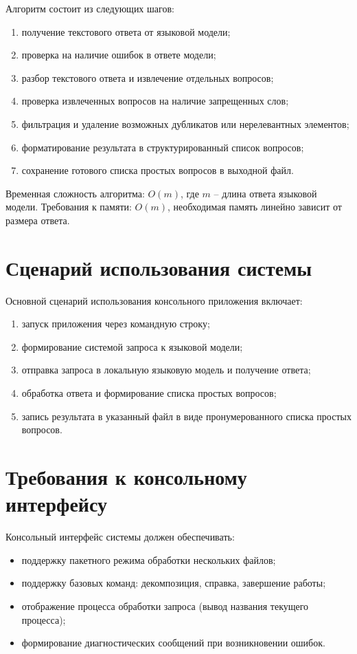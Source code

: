 Алгоритм состоит из следующих шагов:
\begin{enumerate}
	\item получение текстового ответа от языковой модели;
	\item проверка на наличие ошибок в ответе модели;
	\item разбор текстового ответа и извлечение отдельных вопросов;
	\item проверка извлеченных вопросов на наличие запрещенных слов;
	\item фильтрация и удаление возможных дубликатов или нерелевантных элементов;
	\item форматирование результата в структурированный список вопросов;
	\item сохранение готового списка простых вопросов в выходной файл.
\end{enumerate}

Временная сложность алгоритма: $O(m)$, где $m$ -- длина ответа языковой модели.
Требования к памяти: $O(m)$, необходимая память линейно зависит от размера ответа.

\section{Сценарий использования системы}

Основной сценарий использования консольного приложения включает:
\begin{enumerate}
	\item запуск приложения через командную строку;
	\item формирование системой запроса к языковой модели;
	\item отправка запроса в локальную языковую модель и получение ответа;
	\item обработка ответа и формирование списка простых вопросов;
	\item запись результата в указанный файл в виде пронумерованного списка простых вопросов.
\end{enumerate}

\section{Требования к консольному интерфейсу}

Консольный интерфейс системы должен обеспечивать:
\begin{itemize}
	\item поддержку пакетного режима обработки нескольких файлов;
	\item поддержку базовых команд: декомпозиция, справка, завершение работы;
	\item отображение процесса обработки запроса (вывод названия текущего процесса);
	\item формирование диагностических сообщений при возникновении ошибок.
\end{itemize}

